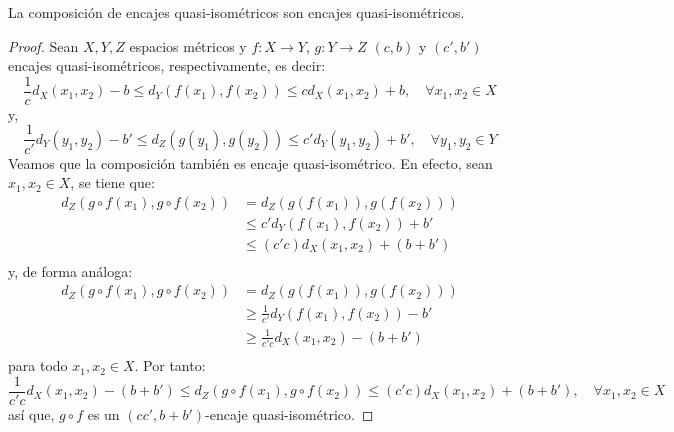\documentclass[12pt]{report}
\newcounter{it}
\theoremstyle{largebreak}
\newcommand\cf[3]{\ensuremath{#1:#2\rightarrow#3}}
\begin{document}
    \begin{excer}
        La composición de encajes quasi-isométricos son encajes quasi-isométricos.    
    \end{excer}

    \begin{proof}
        Sean $X,Y,Z$ espacios métricos y $\cf{f}{X}{Y}$, $\cf{g}{Y}{Z}$ $(c,b)$ y $(c',b')$ encajes quasi-isométricos, respectivamente, es decir:
        \begin{equation*}
            \frac{1}{c}d_X(x_1,x_2)-b\leq d_Y(f(x_1),f(x_2))\leq cd_X(x_1,x_2)+b,\quad\forall x_1,x_2\in X
        \end{equation*}
        y,
        \begin{equation*}
            \frac{1}{c'}d_Y(y_1,y_2)-b'\leq d_Z(g(y_1),g(y_2))\leq c'd_Y(y_1,y_2)+b',\quad\forall y_1,y_2\in Y
        \end{equation*}
        Veamos que la composición también es encaje quasi-isométrico. En efecto, sean $x_1,x_2\in X$, se tiene que:
        \begin{equation*}
            \begin{split}
                d_Z(g\circ f(x_1),g\circ f(x_2))&=d_Z(g(f(x_1)),g(f(x_2)))\\
                &\leq c'd_Y(f(x_1),f(x_2))+b'\\
                &\leq (c'c)d_X(x_1,x_2)+(b+b')\\
            \end{split}
        \end{equation*}
        y, de forma análoga:
        \begin{equation*}
            \begin{split}
                d_Z(g\circ f(x_1),g\circ f(x_2))&=d_Z(g(f(x_1)),g(f(x_2)))\\
                &\geq \frac{1}{c'}d_Y(f(x_1),f(x_2))-b'\\
                &\geq \frac{1}{c'c}d_X(x_1,x_2)-(b+b')\\
            \end{split}
        \end{equation*}
        para todo $x_1,x_2\in X$. Por tanto:
        \begin{equation*}
            \frac{1}{c'c}d_X(x_1,x_2)-(b+b')\leq d_Z(g\circ f(x_1),g\circ f(x_2))\leq(c'c)d_X(x_1,x_2)+(b+b'),\quad\forall x_1,x_2\in X
        \end{equation*}
        así que, $g\circ f$ es un $(cc',b+b')$-encaje quasi-isométrico.
    \end{proof}
\end{document}
